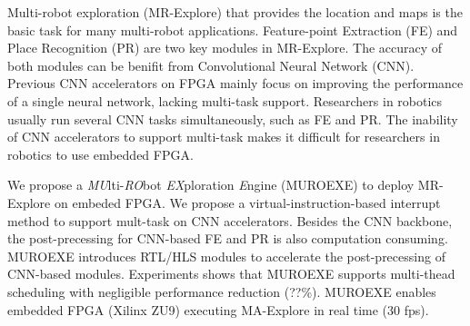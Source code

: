 Multi-robot exploration (MR-Explore) that provides the location and maps is the basic task for many multi-robot applications. 
Feature-point Extraction (FE) and Place Recognition (PR) are two key modules in MR-Explore.
The accuracy of both modules can be benifit from Convolutional Neural Network (CNN).
Previous CNN accelerators on FPGA mainly focus on improving the performance of a single neural network, lacking multi-task support.
Researchers in robotics usually run several CNN tasks simultaneously, such as FE and PR.
The inability of CNN accelerators to support multi-task makes it difficult for researchers in robotics to use embedded FPGA.

We propose a \textit{MU}lti-\textit{RO}bot \textit{EX}ploration \textit{E}ngine (MUROEXE) to deploy MR-Explore on embeded FPGA. 
We propose a virtual-instruction-based interrupt method to support mult-task on CNN accelerators.
Besides the CNN backbone, the post-precessing for CNN-based FE and PR is also computation consuming. 
MUROEXE introduces RTL/HLS modules to accelerate the post-precessing of CNN-based modules.
Experiments shows that MUROEXE supports multi-thead scheduling with negligible performance reduction (??\%).
MUROEXE enables embedded FPGA (Xilinx ZU9) executing MA-Explore in real time (30 fps).